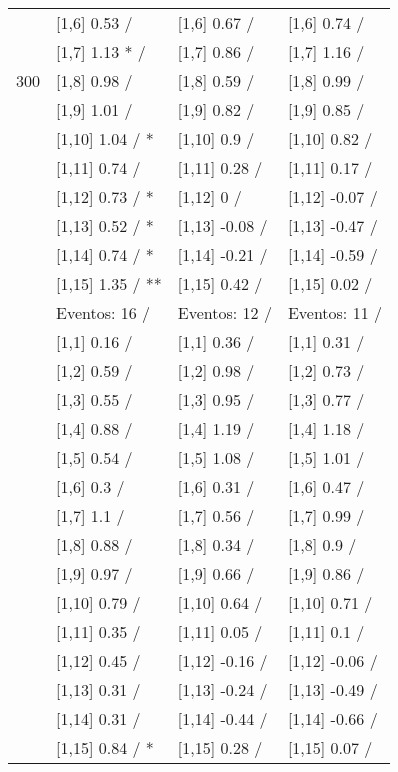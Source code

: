\begin{table}
\begin{tabular}[t]{llll}
 & {}[1,6] 0.53  / & {}[1,6] 0.67  / & {}[1,6] 0.74  /\\
 & {}[1,7] 1.13 * / & {}[1,7] 0.86  / & {}[1,7] 1.16  /\\
300 & {}[1,8] 0.98  / & {}[1,8] 0.59  / & {}[1,8] 0.99  /\\
\addlinespace
 & {}[1,9] 1.01  / & {}[1,9] 0.82  / & {}[1,9] 0.85  /\\
 & {}[1,10] 1.04  / * & {}[1,10] 0.9  / & {}[1,10] 0.82  /\\
 & {}[1,11] 0.74  / & {}[1,11] 0.28  / & {}[1,11] 0.17  /\\
 & {}[1,12] 0.73  / * & {}[1,12] 0  / & {}[1,12] -0.07  /\\
 & {}[1,13] 0.52  / * & {}[1,13] -0.08  / & {}[1,13] -0.47  /\\
\addlinespace
 & {}[1,14] 0.74  / * & {}[1,14] -0.21  / & {}[1,14] -0.59  /\\
 & {}[1,15] 1.35  / ** & {}[1,15] 0.42  / & {}[1,15] 0.02  /\\
 & Eventos:  16 / & Eventos:  12 / & Eventos:  11 /\\
 & {}[1,1] 0.16  / & {}[1,1] 0.36  / & {}[1,1] 0.31  /\\
 & {}[1,2] 0.59  / & {}[1,2] 0.98  / & {}[1,2] 0.73  /\\
\addlinespace
 & {}[1,3] 0.55  / & {}[1,3] 0.95  / & {}[1,3] 0.77  /\\
 & {}[1,4] 0.88  / & {}[1,4] 1.19  / & {}[1,4] 1.18  /\\
 & {}[1,5] 0.54  / & {}[1,5] 1.08  / & {}[1,5] 1.01  /\\
 & {}[1,6] 0.3  / & {}[1,6] 0.31  / & {}[1,6] 0.47  /\\
 & {}[1,7] 1.1  / & {}[1,7] 0.56  / & {}[1,7] 0.99  /\\
\addlinespace
500 & {}[1,8] 0.88  / & {}[1,8] 0.34  / & {}[1,8] 0.9  /\\
 & {}[1,9] 0.97  / & {}[1,9] 0.66  / & {}[1,9] 0.86  /\\
 & {}[1,10] 0.79  / & {}[1,10] 0.64  / & {}[1,10] 0.71  /\\
 & {}[1,11] 0.35  / & {}[1,11] 0.05  / & {}[1,11] 0.1  /\\
 & {}[1,12] 0.45  / & {}[1,12] -0.16  / & {}[1,12] -0.06  /\\
\addlinespace
 & {}[1,13] 0.31  / & {}[1,13] -0.24  / & {}[1,13] -0.49  /\\
 & {}[1,14] 0.31  / & {}[1,14] -0.44  / & {}[1,14] -0.66  /\\
 & {}[1,15] 0.84  / * & {}[1,15] 0.28  / & {}[1,15] 0.07  /\\
\bottomrule
\end{tabular}
\end{table}
